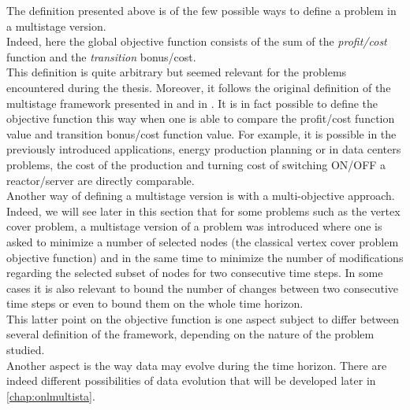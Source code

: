 \documentclass[a4paper]{book}
\newtheorem{definition}{Definition}
\begin{document}
The definition presented above is of the few possible ways to define a problem in a multistage version.\\

Indeed, here the global objective function consists of the sum of the \textit{profit/cost} function and the \textit{transition} bonus/cost.\\ This definition is quite arbitrary but seemed relevant for the problems encountered during the thesis. Moreover, it follows the original definition of the multistage framework presented in \cite{Gupta} and in \cite{Eisenstat}. It is in fact possible to define the objective function this way when one is able to compare the profit/cost function value and transition bonus/cost function value. For example, it is possible in the previously introduced applications, energy production planning or in data centers problems, the cost of the production  and turning cost of switching ON/OFF a reactor/server are directly comparable.\\
Another way of defining a multistage version is with a multi-objective approach. Indeed, we will see later in this section that for some problems such as the {\sc vertex cover} problem, a multistage version of a problem was introduced where  
one is asked to minimize a number of selected nodes (the classical {\sc vertex cover} problem objective function) and in the same time to minimize the number of modifications regarding the selected subset of nodes for two consecutive time steps. In some cases it is also relevant to bound the number of changes between two consecutive time steps or even to bound them on the whole time horizon. \\

This latter point on the objective function is one aspect subject to differ between several definition of the framework, depending on the nature of the problem studied. \\
Another aspect is the way data may evolve during the time horizon. There are indeed different possibilities of data evolution that will be developed later in \ref{chap:onlmultista}.
\end{document}
